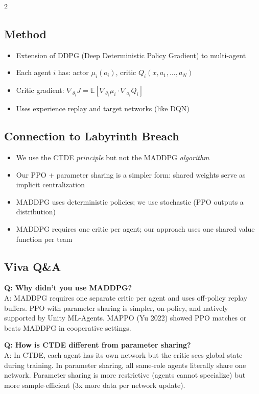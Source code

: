\documentclass[10pt,a4paper]{article}
\begin{document}
\begin{multicols}{2}
\subsection{Method}
\begin{itemize}
\item Extension of DDPG (Deep Deterministic Policy Gradient) to multi-agent
\item Each agent $i$ has: actor $\mu_i(o_i)$, critic $Q_i(x, a_1, \ldots, a_N)$
\item Critic gradient: $\nabla_{\theta_i} J = \mathbb{E}[\nabla_{\theta_i}\mu_i \cdot \nabla_{a_i} Q_i]$
\item Uses experience replay and target networks (like DQN)
\end{itemize}

\subsection{Connection to Labyrinth Breach}
\begin{itemize}
\item We use the CTDE \textit{principle} but not the MADDPG \textit{algorithm}
\item Our PPO + parameter sharing is a simpler form: shared weights serve as implicit centralization
\item MADDPG uses deterministic policies; we use stochastic (PPO outputs a distribution)
\item MADDPG requires one critic per agent; our approach uses one shared value function per team
\end{itemize}

\subsection{Viva Q\&A}

\textbf{Q: Why didn't you use MADDPG?} \\
A: MADDPG requires one separate critic per agent and uses off-policy replay buffers. PPO with parameter sharing is simpler, on-policy, and natively supported by Unity ML-Agents. MAPPO (Yu 2022) showed PPO matches or beats MADDPG in cooperative settings.

\textbf{Q: How is CTDE different from parameter sharing?} \\
A: In CTDE, each agent has its own network but the critic sees global state during training. In parameter sharing, all same-role agents literally share one network. Parameter sharing is more restrictive (agents cannot specialize) but more sample-efficient (3x more data per network update).


\end{multicols}
\end{document}
